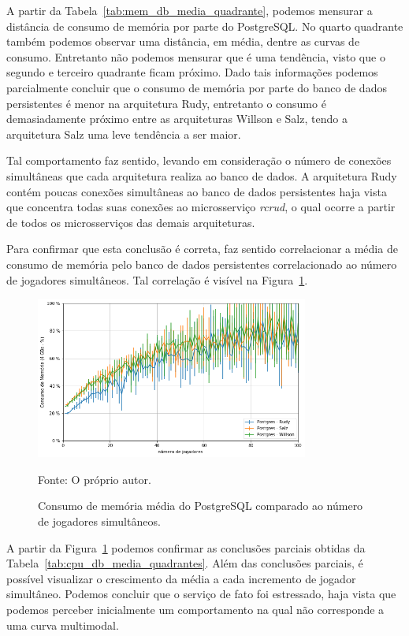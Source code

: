 A partir da Tabela~\ref{tab:mem_db_media_quadrante}, podemos mensurar a distância de consumo de memória por parte do PostgreSQL.
%
No quarto quadrante também podemos observar uma distância, em média, dentre as curvas de consumo.
%
Entretanto não podemos mensurar que é uma tendência, visto que o segundo e terceiro quadrante ficam próximo.
%
Dado tais informações podemos parcialmente concluir que o consumo de memória por parte do banco de dados persistentes é menor na arquitetura Rudy, entretanto o consumo é demasiadamente próximo entre as arquiteturas Willson e Salz, tendo a arquitetura Salz uma leve tendência a ser maior.

Tal comportamento faz sentido, levando em consideração o número de conexões simultâneas que cada arquitetura realiza ao banco de dados.
%
A arquitetura Rudy contém poucas conexões simultâneas ao banco de dados persistentes haja vista que concentra todas suas conexões ao microsserviço \textit{rcrud}, o qual ocorre a partir de todos os microsserviços das demais arquiteturas.

Para confirmar que esta conclusão é correta, faz sentido correlacionar a média de consumo de memória pelo banco de dados persistentes correlacionado ao número de jogadores simultâneos.
%
Tal correlação é visível na Figura~\ref{fig:mem_db_media_por_jogador}.

\begin{figure}[htb!]
  \caption{Consumo de memória média do PostgreSQL comparado ao número de jogadores simultâneos.}
  \label{fig:mem_db_media_por_jogador}
  \includegraphics[width=0.8\textwidth]{figuras/analise/mem_db_media_por_jogador.png}
  \centering

  Fonte: O próprio autor.
\end{figure}

A partir da Figura~\ref{fig:mem_db_media_por_jogador} podemos confirmar as conclusões parciais obtidas da Tabela~\ref{tab:cpu_db_media_quadrantes}.
%
Além das conclusões parciais, é possível visualizar o crescimento da média a cada incremento de jogador simultâneo.
%
Podemos concluir que o serviço de fato foi estressado, haja vista que podemos perceber inicialmente um comportamento na qual não corresponde a uma curva multimodal.

